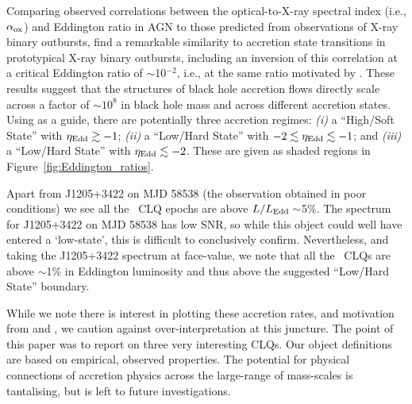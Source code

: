 \documentclass[fleqn,usenatbib]{mnras}
\begin{document}
Comparing observed correlations between the optical-to-X-ray spectral
index (i.e., $\alpha_{\rm ox}$) and Eddington ratio in AGN to those
predicted from observations of X-ray binary outbursts,
\citet{Ruan2019a} find a remarkable similarity to accretion state
transitions in prototypical X-ray binary outbursts, including an
inversion of this correlation at a critical Eddington ratio of
$\sim$10$^{-2}$, i.e., at the same ratio motivated by
\citet{NodaDone2018}.  These results suggest that the structures of
black hole accretion flows directly scale across a factor of
$\sim10^{8}$ in black hole mass and across different accretion
states. Using \citet{Ruan2019a} as a guide, there are potentially
three accretion regimes: {\it (i)} a ``High/Soft State'' with
$\eta_{\rm Edd} \gtrsim -1$; {\it (ii)} a ``Low/Hard State'' with $-2
\lesssim \eta_{\rm Edd} \lesssim -1$; and {\it (iii)} a ``Low/Hard
State'' with $\eta_{\rm Edd} \lesssim -2$.  These are given as shaded
regions in Figure~\ref{fig:Eddington_ratios}.

Apart from J1205+3422 on MJD 58538 (the observation obtained in poor
conditions) we see all the \civ\ CLQ epochs are above $L / L_{\rm Edd}
\sim$5\%. The spectrum for J1205+3422 on MJD 58538 has low SNR, so
while this object could well have entered a `low-state', this is
difficult to conclusively confirm.  Nevertheless, and taking the
J1205+3422 spectrum at face-value, we note that all the \civ\ CLQs are
above $\sim$1\% in Eddington luminosity and thus above the suggested
``Low/Hard State'' boundary.

While we note there is interest in plotting these accretion rates, and
motivation from \citet{NodaDone2018} and \citet{Ruan2019a}, we caution
against over-interpretation at this juncture. The point of this paper
was to report on three very interesting CLQs.  Our object definitions
are based on empirical, observed properties.  The potential for
physical connections of accretion physics across the large-range of
mass-scales is tantalising, but is left to future investigations.



\end{document}
